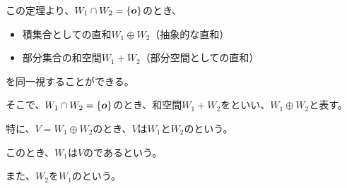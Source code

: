 \documentclass[../../../topic_linear-algebra]{subfiles}
\begin{document}
この定理より、$W_1 \cap W_2 = \{ \vb*{o} \}$のとき、
\begin{itemize}
  \item 積集合としての直和$W_1 \oplus W_2$（抽象的な直和）
  \item 部分集合の和空間$W_1 + W_2$（部分空間としての直和）
\end{itemize}
を同一視することができる。

\br

そこで、$W_1 \cap W_2 = \{ \vb*{o} \}$のとき、和空間$W_1 + W_2$をといい、$W_1 \oplus W_2$と表す。

\br

特に、$V = W_1 \oplus W_2$のとき、$V$は$W_1$と$W_2$のという。

このとき、$W_1$は$V$のであるという。

また、$W_2$を$W_1$のという。

\begin{mindflow}
\end{mindflow}
\end{document}
